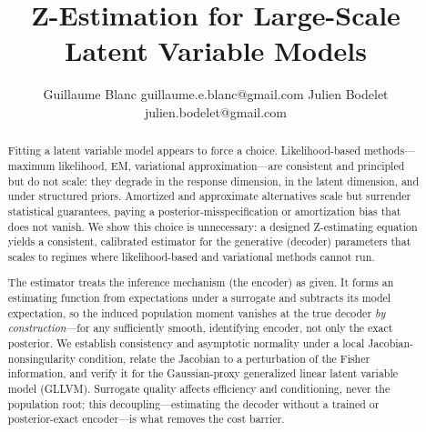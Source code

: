 \documentclass[twoside,11pt]{article}
\begin{document}
\title{Z-Estimation for Large-Scale Latent Variable Models}

\author{\name Guillaume Blanc \email guillaume.e.blanc@gmail.com
  \AND
  \name Julien Bodelet \email julien.bodelet@gmail.com
}

\editor{} %

\maketitle

\begin{abstract}

Fitting a latent variable model appears to force a choice. Likelihood-based methods---maximum likelihood, EM, variational approximation---are consistent and principled but do not scale: they degrade in the response dimension, in the latent dimension, and under structured priors. Amortized and approximate alternatives scale but surrender statistical guarantees, paying a posterior-misspecification or amortization bias that does not vanish. We show this choice is unnecessary: a designed Z-estimating equation yields a consistent, calibrated estimator for the generative (decoder) parameters that scales to regimes where likelihood-based and variational methods cannot run.

The estimator treats the inference mechanism (the encoder) as given. It forms an estimating function from expectations under a surrogate and subtracts its model expectation, so the induced population moment vanishes at the true decoder \emph{by construction}---for any sufficiently smooth, identifying encoder, not only the exact posterior. We establish consistency and asymptotic normality under a local Jacobian-nonsingularity condition, relate the Jacobian to a perturbation of the Fisher information, and verify it for the Gaussian-proxy generalized linear latent variable model (GLLVM). Surrogate quality affects efficiency and conditioning, never the population root; this decoupling---estimating the decoder without a trained or posterior-exact encoder---is what removes the cost barrier.


\end{abstract}
\end{document}
